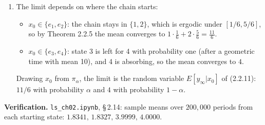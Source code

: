 \documentclass[12pt, letterpaper]{article}
\newcommand{\nb}[1]{\texttt{ls\_ch02.ipynb}, \S\,#1}
\begin{document}
\begin{tcolorbox}[evenbox,title={Exercise 2.14 \quad A Reducible Four-State Chain}]
\begin{enumerate}
\item The limit depends on where the chain starts:
\begin{itemize}
\item $x_0\in\{e_1,e_2\}$: the chain stays in $\{1,2\}$, which is ergodic under $[1/6,5/6]$, so by
Theorem 2.2.5 the mean converges to $1\cdot\frac16+2\cdot\frac56=\boxed{\tfrac{11}{6}}$.
\item $x_0\in\{e_3,e_4\}$: state 3 is left for 4 with probability one (after a geometric time with mean
10), and 4 is absorbing, so the mean converges to $\boxed{4}$.
\end{itemize}
Drawing $x_0$ from $\pi_\alpha$, the limit is the random variable $E[y_\infty|x_0]$ of (2.2.11):
$11/6$ with probability $\alpha$ and $4$ with probability $1-\alpha$.
\end{enumerate}

\textbf{Verification.} \nb{2.14}: sample means over $200{,}000$ periods from each starting state:
$1.8341,\,1.8327,\,3.9999,\,4.0000$. \checkmark
\end{tcolorbox}
\end{document}
